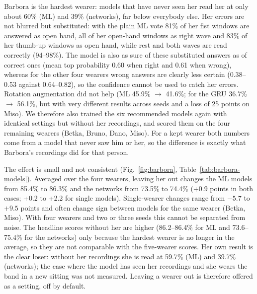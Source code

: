 \documentclass[conference]{IEEEtran}
\begin{document}
Barbora is the hardest wearer: models
that have never seen her read her at only about 60\% (ML) and 39\% (networks), far
below everybody else. Her errors are not blurred but substituted: with the plain ML
vote 81\% of her fist windows are answered as open hand, all of her open-hand windows
as right wave and 83\% of her thumb-up windows as open hand, while rest and both waves
are read correctly (94--98\%). The model is also as sure of these substituted answers
as of correct ones (mean top probability 0.60 when right and 0.61 when wrong), whereas
for the other four wearers wrong answers are clearly less certain (0.38--0.53 against
0.64--0.82), so the confidence cannot be used to catch her errors. Rotation augmentation did not help (ML 45.9\% $\to$ 41.6\%;
for the GRU 36.7\% $\to$ 56.1\%, but with very different results across seeds and
a loss of 25 points on Miso). We therefore also trained the six recommended models
again with identical settings but without her recordings, and scored them on the
four remaining wearers (Betka, Bruno, Dano, Miso). For a kept wearer both numbers
come from a model that never saw him or her, so the difference is exactly what
Barbora's recordings did for that person.

The effect is small and not consistent (Fig.~\ref{fig:barbora},
Table~\ref{tab:barbora-models}). Averaged over the four wearers, leaving her out
changes the ML models from 85.4\% to 86.3\% and the networks from 73.5\% to 74.4\%
(+0.9 points in both cases; +0.2 to +2.2 for single models). Single-wearer changes
range from $-5.7$ to $+9.5$ points and often change sign between models for the
same wearer (Betka, Miso). With four wearers and two or three seeds this cannot be
separated from noise. The headline scores without her are higher
(86.2--86.4\% for ML and 73.6--75.4\% for the networks) only because the hardest
wearer is no longer in the average, so they are not comparable with the five-wearer
scores. Her own result is the clear loser: without her recordings she is read at
59.7\% (ML) and 39.7\% (networks); the case where the model has seen her recordings
and she wears the band in a new sitting was not measured. Leaving a wearer out is
therefore offered as a setting, off by default.
\end{document}
